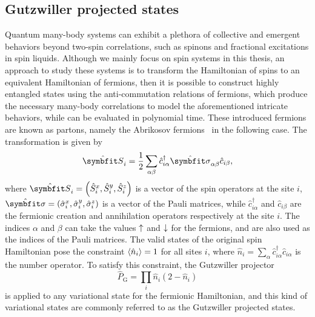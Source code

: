 \subsection{Gutzwiller projected states}
\label{sec:gutz}

Quantum many-body systems can exhibit a plethora of collective and emergent behaviors beyond two-spin correlations, such as spinons and fractional excitations in spin liquids. Although we mainly focus on spin systems in this thesis, an approach to study these systems is to transform the Hamiltonian of spins to an equivalent Hamiltonian of fermions, then it is possible to construct highly entangled states using the anti-commutation relations of fermions, which produce the necessary many-body correlations to model the aforementioned intricate behaviors, while can be evaluated in polynomial time. These introduced fermions are known as partons, namely the Abrikosov fermions~\cite{abrikosov1965electron} in the following case. The transformation is given by
\begin{equation}
\hat{\vS}_i = \frac{1}{2} \sum_{\alpha \beta} \hat{c}^\dagger_{i \alpha} \hat{\vsi}_{\alpha \beta} \hat{c}_{i \beta},
\end{equation}
where $\hat{\vS}_i = \left( \hat{S}^x_i, \hat{S}^y_i, \hat{S}^z_i \right)$ is a vector of the spin operators at the site $i$, $\hat{\vsi} = \left( \hat{\sigma}^x_i, \hat{\sigma}^y_i, \hat{\sigma}^z_i \right)$ is a vector of the Pauli matrices, while $\hat{c}^\dagger_{i \alpha}$ and $\hat{c}_{i \beta}$ are the fermionic creation and annihilation operators respectively at the site $i$. The indices $\alpha$ and $\beta$ can take the values ${\uparrow}$ and ${\downarrow}$ for the fermions, and are also used as the indices of the Pauli matrices. The valid states of the original spin Hamiltonian pose the constraint $\ev{\hat{n}_i} = 1$ for all sites $i$, where $\hat{n}_i = \sum_\alpha \hat{c}^\dagger_{i \alpha} \hat{c}_{i \alpha}$ is the number operator. To satisfy this constraint, the Gutzwiller projector~\cite{gutzwiller1963effect}
\begin{equation}
\hat{P}_\text{G} = \prod_i \hat{n}_i (2 - \hat{n}_i)
\end{equation}
is applied to any variational state for the fermionic Hamiltonian, and this kind of variational states are commonly referred to as the Gutzwiller projected states.

